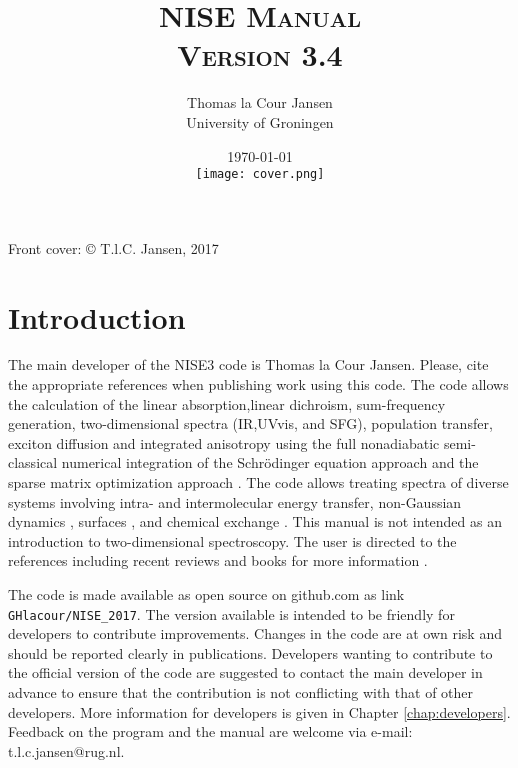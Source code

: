 \documentclass[12pt]{book}
\title{\textsc{NISE Manual\\ Version 3.4}}
\author{Thomas la Cour Jansen\\ University of Groningen}
\date{\today\\ \texttt{[image: cover.png]}}
\begin{document}
\maketitle

\thispagestyle{empty}
\rule{0mm}{0mm}
\noindent
\thispagestyle{empty}
Front cover: 
\copyright \/ T.l.C. Jansen, 2017
\setcounter{page}{1}
\thispagestyle{empty}
\clearpage

\setcounter{page}{1}


\chapter{Introduction}
The main developer of the NISE3 code is Thomas la Cour Jansen. Please, cite the appropriate
references \cite{Jansen.2006.JPCB.110.22910,Jansen.2009.ACR.42.1405,Jansen.2010.JCP.132.224503,Liang.2012.JCTC.8.1706,Liang.2013.JPCL.4.448}
when publishing work using this code. The code allows the calculation of the linear absorption,linear dichroism, sum-frequency generation, two-dimensional spectra (IR,UVvis, and SFG), population transfer, exciton diffusion and integrated anisotropy using the full nonadiabatic semi-classical numerical integration of the Schr\"{o}dinger equation approach
\cite{Jansen.2009.ACR.42.1405} and the sparse matrix optimization approach \cite{Liang.2012.JCTC.8.1706}. The code allows treating spectra of diverse systems involving
intra- and intermolecular energy transfer\cite{Jansen.2006.JPCB.110.22910,Cringus.2007.JCP.127.084507,Jansen.2008.BJ.94.1818,Dijkstra.2010.JPCA.114.7315,Jansen.2010.JCP.132.224503}, non-Gaussian dynamics \cite{Jansen.2009.JPCA.113.6260,Roy.2011.JPCB.115.5431}, surfaces \cite{Liang.2013.JPCL.4.448}, and chemical exchange \cite{Jansen.2007.JCP.127.234502}. This manual is not intended as an introduction to two-dimensional
spectroscopy. The user is directed to the references including recent reviews \cite{Hamm.1998.JPCB.102.6123,Hochstrasser.2001.CP.266.273,Cho.2008.CR.108.1331,Mukamel.2000.ARPC.51.691,Jansen.2009.ACR.42.1405} and books
for more information \cite{Cho.2009.B01,Mukamel.1995.B01,Hamm.2011.B01}.

The code is made available as open source on github.com as link {\tt GHlacour/NISE\_2017}. The version available is intended to be friendly for developers to contribute improvements. Changes in the code are at own risk and should be reported clearly in publications. Developers wanting to contribute to the official version of the code are suggested to contact the main developer in advance to ensure that the contribution is not conflicting with that of other developers. More information for developers is given in Chapter \ref{chap:developers}. Feedback on the program and the manual are welcome via e-mail: t.l.c.jansen@rug.nl. 
\end{document}
